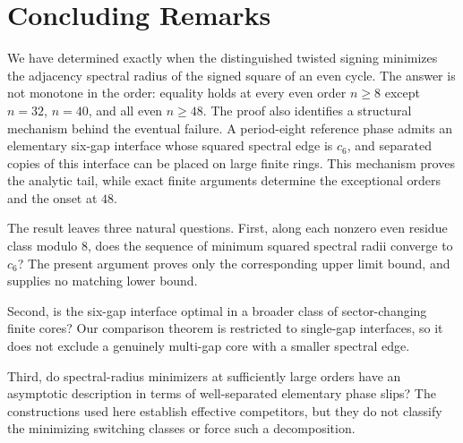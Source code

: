 \section{Concluding Remarks}
\label{sec:concluding}

We have determined exactly when the distinguished twisted signing minimizes
the adjacency spectral radius of the signed square of an even cycle.  The
answer is not monotone in the order: equality holds at every even order
$n\geq 8$ except $n=32$, $n=40$, and all even $n\geq 48$.  The proof also
identifies a structural mechanism behind the eventual failure.  A
period-eight reference phase admits an elementary six-gap interface whose
squared spectral edge is $c_6$, and separated copies of this interface can be
placed on large finite rings.  This mechanism proves the analytic tail, while
exact finite arguments determine the exceptional orders and the onset at
$48$.

The result leaves three natural questions.  First, along each nonzero even
residue class modulo $8$, does the sequence of minimum squared spectral radii
converge to $c_6$?  The present argument proves only the corresponding upper
limit bound, and supplies no matching lower bound.

Second, is the six-gap interface optimal in a broader class of
sector-changing finite cores?  Our comparison theorem is restricted to
single-gap interfaces, so it does not exclude a genuinely multi-gap core with
a smaller spectral edge.

Third, do spectral-radius minimizers at sufficiently large orders have an
asymptotic description in terms of well-separated elementary phase slips?
The constructions used here establish effective competitors, but they do not
classify the minimizing switching classes or force such a decomposition.
